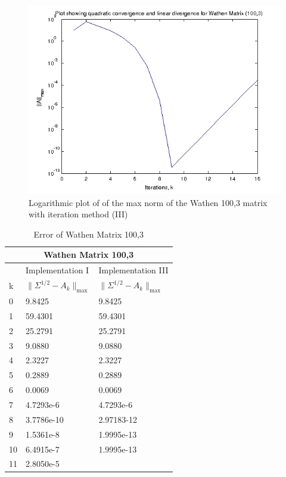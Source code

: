 \begin{center}
\begin{figure}[h!]
\centering
\includegraphics[scale=0.67]{configIII.png}
\caption{Logarithmic plot of of the max norm of the Wathen 100,3 matrix with iteration method (III)}
\label{fig:convergence plot III}
\end{figure}
\end{center}




\begin{table}
\begin{center}

\begin{tabular}{| l | l | l | }

	\hline
	\multicolumn{3}{|c|}{Wathen Matrix 100,3}  \\
	\hline
	   & Implementation I & Implementation III \\
	k & $\parallel \Sigma^{1/2} - A_{k}\parallel_{\text{max}}$ & $\parallel \Sigma^{1/2} - A_{k}\parallel_{\text{max}}$  \\	
	\hline
	0 & 9.8425 & 9.8425  \\
	1 & 59.4301& 59.4301  \\
	2 & 25.2791& 25.2791   \\
	3 & 9.0880& 9.0880  \\
	4 & 2.3227& 2.3227  \\
	5 & 0.2889& 0.2889  \\
	6 & 0.0069& 0.0069  \\
	7 & 4.7293e-6& 4.7293e-6  \\
	8 & 3.7786e-10& 2.97183-12  \\
	9 & 1.5361e-8& 1.9995e-13  \\
	10& 6.4915e-7 & 1.9995e-13 \\ 
	11& 2.8050e-5 & \\
	\hline
	
\end{tabular}
\end{center}

\caption{Error of Wathen Matrix 100,3}
\label{lol}
\end{table}

